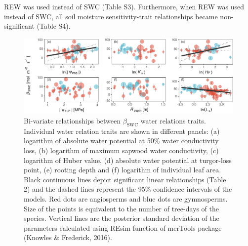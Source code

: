 \documentclass[11pt,twoside]{reedthesis}
\begin{document}
REW was used instead of SWC (Table S3). Furthermore, when REW was used
instead of SWC, all soil moisture sensitivity-trait relationships became
non-significant (Table S4).\par
\begin{figure}[hbt!]

{\centering \includegraphics[width=1\linewidth]{figure/CH5/Figure_5} 

}

\caption[Bi-variate relationships between $\beta_{\text{SWC}}$ water relations traits.]{Bi-variate relationships between $\beta_{\text{SWC}}$ water relations traits. Individual water relation traits are shown in different panels: (a) logarithm of absolute water potential at 50\% water conductivity loss, (b) logarithm of maximum sapwood water conductivity, (c) logarithm of Huber value, (d) absolute water potential at turgor-loss point, (e) rooting depth and (f) logarithm of individual leaf area. Black continuous lines depict significant linear relationships (Table 2) and the dashed lines represent the 95\% confidence intervals of the models. Red dots are angiosperms and blue dots are gymnosperms. Size of the points is equivalent to the number of tree-days of the species. Vertical lines are the posterior standard deviation of the parameters calculated using REsim function of merTools package (Knowles \& Frederick, 2016).}\label{fig:ch5fig5}
\end{figure}
\end{document}
